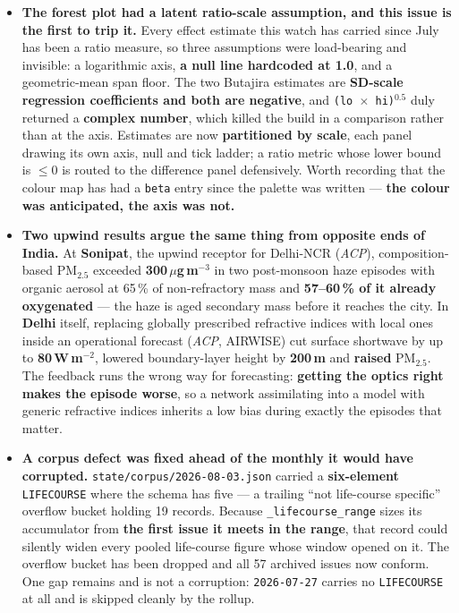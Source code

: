 \documentclass[10pt]{article}
\begin{document}
\begin{itemize}
\item \textbf{The forest plot had a latent
ratio-scale assumption, and this issue is the first to trip it.} Every effect estimate this
watch has carried since July has been a ratio measure, so three assumptions were
load-bearing and invisible: a logarithmic axis, \textbf{a null line hardcoded at 1.0}, and a
geometric-mean span floor. The two Butajira estimates are \textbf{SD-scale regression
coefficients and both are negative}, and \texttt{(lo\,$\times$\,hi)$^{0.5}$} duly returned a
\textbf{complex number}, which killed the build in a comparison rather than at the axis.
Estimates are now \textbf{partitioned by scale}, each panel drawing its own axis, null and
tick ladder; a ratio metric whose lower bound is $\leq 0$ is routed to the difference panel
defensively. Worth recording that the colour map has had a \texttt{beta} entry since the
palette was written --- \textbf{the colour was anticipated, the axis was not.}

\item \textbf{Two upwind results argue the same
thing from opposite ends of India.} At \textbf{Sonipat}, the upwind receptor for Delhi-NCR
(\textit{ACP}), composition-based PM$_{2.5}$ exceeded \textbf{300\,$\mu$g\,m$^{-3}$} in two
post-monsoon haze episodes with organic aerosol at 65\,\% of non-refractory mass and
\textbf{57--60\,\% of it already oxygenated} --- the haze is aged secondary mass before it
reaches the city. In \textbf{Delhi} itself, replacing globally prescribed refractive indices
with local ones inside an operational forecast (\textit{ACP}, AIRWISE) cut surface
shortwave by up to \textbf{80\,W\,m$^{-2}$}, lowered boundary-layer height by
\textbf{200\,m} and \textbf{raised} PM$_{2.5}$. The feedback runs the wrong way for
forecasting: \textbf{getting the optics right makes the episode worse}, so a network
assimilating into a model with generic refractive indices inherits a low bias during exactly
the episodes that matter.

\item \textbf{A corpus defect was fixed ahead of
the monthly it would have corrupted.} \texttt{state/corpus/2026-08-03.json} carried a
\textbf{six-element} \texttt{LIFECOURSE} where the schema has five --- a trailing ``not
life-course specific'' overflow bucket holding 19 records. Because
\texttt{\_lifecourse\_range} sizes its accumulator from \textbf{the first issue it meets in
the range}, that record could silently widen every pooled life-course figure whose window
opened on it. The overflow bucket has been dropped and all 57 archived issues now conform.
One gap remains and is not a corruption: \texttt{2026-07-27} carries no
\texttt{LIFECOURSE} at all and is skipped cleanly by the rollup.

\end{itemize}
\end{document}
